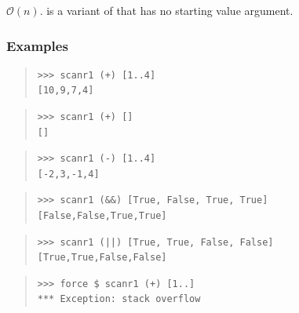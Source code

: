 \begin{haddockdesc}
\item[\begin{tabular}{@{}l}
scanr1 :: (a -> a -> a) -> {\char 91}a{\char 93} -> {\char 91}a{\char 93}
\end{tabular}]
{\haddockbegindoc
\(\mathcal{O}(n)\).  is a variant of  that has no starting
 value argument.\par
\subsubsection*{\textbf{Examples}}
\begin{quote}
{\haddockverb\begin{verbatim}
>>> scanr1 (+) [1..4]
[10,9,7,4]

\end{verbatim}}
\end{quote}
\begin{quote}
{\haddockverb\begin{verbatim}
>>> scanr1 (+) []
[]

\end{verbatim}}
\end{quote}
\begin{quote}
{\haddockverb\begin{verbatim}
>>> scanr1 (-) [1..4]
[-2,3,-1,4]

\end{verbatim}}
\end{quote}
\begin{quote}
{\haddockverb\begin{verbatim}
>>> scanr1 (&&) [True, False, True, True]
[False,False,True,True]

\end{verbatim}}
\end{quote}
\begin{quote}
{\haddockverb\begin{verbatim}
>>> scanr1 (||) [True, True, False, False]
[True,True,False,False]

\end{verbatim}}
\end{quote}
\begin{quote}
{\haddockverb\begin{verbatim}
>>> force $ scanr1 (+) [1..]
*** Exception: stack overflow

\end{verbatim}}
\end{quote}}
\end{haddockdesc}
